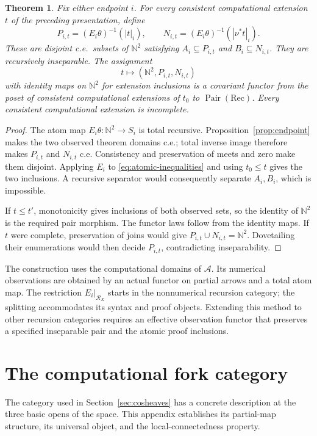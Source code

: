 \documentclass[11pt]{article}
\newtheorem{theorem}{Theorem}[section]
\newcommand{\N}{\mathbb N}
\begin{document}
\begin{theorem}\label{thm:cosheaf-observation}
Fix either endpoint $i$. For every consistent computational
extension $t$ of the preceding presentation, define
\[
 P_{i,t}=(E_i\theta)^{-1}(|t|_i),\qquad
 N_{i,t}=(E_i\theta)^{-1}(|\nu^*t|_i).
\]
These are disjoint c.e.\ subsets of $\N^2$ satisfying
$A_i\subseteq P_{i,t}$ and $B_i\subseteq N_{i,t}$.
They are recursively inseparable. The assignment
\[
 t\longmapsto(\N^2,P_{i,t},N_{i,t})
\]
with identity maps on $\N^2$ for extension inclusions is a
covariant functor from the poset of consistent computational
extensions of $t_0$ to $\operatorname{Pair}(\mathrm{Rec})$.
Every consistent computational extension is incomplete.
\end{theorem}
\begin{proof}
The atom map $E_i\theta:\N^2\to S_i$ is total recursive.
Proposition~\ref{prop:endpoint} makes the two observed theorem
domains c.e.; total inverse image therefore makes $P_{i,t}$
and $N_{i,t}$ c.e. Consistency and preservation of meets and
zero make them disjoint. Applying $E_i$ to
\eqref{eq:atomic-inequalities} and using $t_0\le t$ gives
the two inclusions. A recursive separator would consequently
separate $A_i,B_i$, which is impossible.

If $t\le t'$, monotonicity gives inclusions of both observed
sets, so the identity of $\N^2$ is the required pair morphism.
The functor laws follow from the identity maps. If $t$ were
complete, preservation of joins would give
$P_{i,t}\cup N_{i,t}=\N^2$. Dovetailing their enumerations would
then decide $P_{i,t}$, contradicting inseparability.
\end{proof}

The construction uses the computational domains of
$\mathcal A$. Its numerical observations are obtained by an
actual functor on partial arrows and a total atom map.
The restriction $E_i|_{\mathscr R_X}$ starts in the nonnumerical
recursion category; the splitting accommodates its syntax and
proof objects. Extending this method to other recursion categories
requires an effective observation functor that preserves a specified
inseparable pair and the atomic proof inclusions.

\appendix

\section{The computational fork category}\label{app:fork-structure}

The category used in Section~\ref{sec:cosheaves} has a concrete
description at the three basic opens of the space. This appendix
establishes its partial-map structure, its universal object, and the
local-connectedness property.
\end{document}
